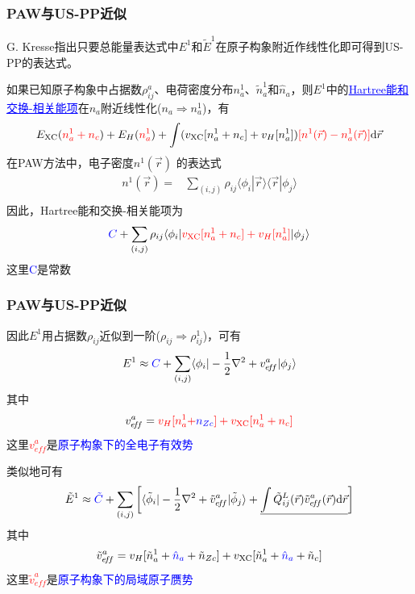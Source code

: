 \documentclass[cjk,slidestop,compress,mathserif,blue]{beamer}
\begin{document}
\frame
{
	\frametitle{\textrm{PAW}与\textrm{US-PP}近似}
	\textrm{G. Kresse}指出只要总能量表达式中$E^1$和$\tilde E^1$在原子构象附近作线性化即可得到\textrm{US-PP}的表达式。
	
	如果已知原子构象中占据数$\rho_{ij}^a$、电荷密度分布$n_a^1$、$\tilde n_a^1$和$\hat n_a$，则$E^1$中的\textcolor{blue}{\underline{\textrm{Hartree}能和交换-相关能项}}在$n_a$附近线性化($n_a\Rightarrow n_a^1$)，有
	\begin{displaymath}
		E_{\mathrm{XC}}(\textcolor{red}{n_a^1+n_c})+E_H(\textcolor{red}{n_a^1})+\int(v_{\mathrm{XC}}[n_a^1+n_c]+v_H[n_a^1])\textcolor{red}{[n^1(\vec r)-n_a^1(\vec r)]}\mathrm{d}\vec r
	\end{displaymath}
	在\textrm{PAW}方法中，电子密度$n^1(\vec r)$%
	的表达式
	\begin{displaymath}
		\begin{aligned}
			n^1(\vec r)=&\sum_{(i,j)}\rho_{ij}\langle\phi_i|\vec r\rangle\langle\vec r|\phi_j\rangle\\
		\end{aligned}
	\end{displaymath}
	因此，\textrm{Hartree}能和交换-相关能项为
	$$\textcolor{blue}{C}+\sum_{(i,j)}\rho_{ij}\langle\phi_i|\textcolor{red}{v_{\mathrm{XC}}[n_a^1+n_c]+v_H[n_a^1]}|\phi_j\rangle$$
	这里\textcolor{blue}{\textrm{C}}是常数
}

\frame
{
	\frametitle{\textrm{PAW}与\textrm{US-PP}近似}
	因此$E^1$用占据数$\rho_{ij}$近似到一阶($\rho_{ij}\Rightarrow\rho_{ij}^1$)，可有
	\begin{displaymath}
		E^1\approx\textcolor{blue}{C}+\sum_{(i,j)}\langle\phi_i|-\frac12\nabla^2+v_{e\!f\!f}^a|\phi_j\rangle
	\end{displaymath}
	其中
	\begin{displaymath}
		v_{e\!f\!f}^a=\textcolor{red}{v_H[n_a^1+}\textcolor{blue}{n_{Zc}}\textcolor{red}{]+v_{\mathrm{XC}}[n_a^1+n_c]}
	\end{displaymath}
	这里\textcolor{red}{$v_{e\!f\!f}^a$}是\textcolor{blue}{原子构象下的全电子有效势}

	类似地可有
	\begin{displaymath}
		\tilde E^1\approx\textcolor{blue}{\tilde C}+\sum_{(i,j)}\left[\langle\tilde\phi_i|-\frac12\nabla^2+\tilde v_{e\!f\!f}^a|\tilde\phi_j\rangle+\underline{\int\tilde Q_{ij}^L(\vec r)\tilde v_{e\!f\!f}^a(\vec r)\mathrm{d}\vec r}\right]
	\end{displaymath}
	其中$$\tilde v_{e\!f\!f}^a=v_H[\tilde n_a^1+\textcolor{blue}{\hat n_a}+\tilde n_{Zc}]+v_{\mathrm{XC}}[\tilde n_a^1+\textcolor{blue}{\hat n_a}+\tilde n_c]$$
	这里\textcolor{red}{$\tilde v_{e\!f\!f}^a$}是\textcolor{blue}{原子构象下的局域原子赝势}
}
\end{document}
